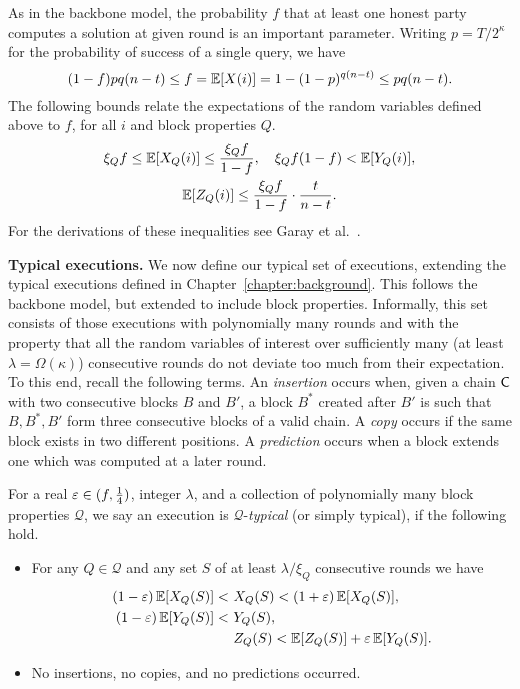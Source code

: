 As in the backbone model, the probability $f$ that at least one honest party
computes a solution at given round is an important parameter.
Writing $p=T/2^\kappa$ for the probability of success of a single query, we
have
\[
	(1-f){pq(n-t)}\leq f=\operatorname{\mathbb{E}}[X(i)]=1-(1-p)^{q(n-t)}\leq pq(n-t)
.\]
The following bounds relate the expectations of the random variables defined
above to $f$, for all $i$ and block properties $Q$.
\begin{gather*}
	\xi_Q f\leq\operatorname{\mathbb{E}}[X_Q(i)]\leq\frac{\xi_Q f}{1-f},\quad
		\xi_Q f(1-f)<\operatorname{\mathbb{E}}[Y_Q(i)],\\
	\operatorname{\mathbb{E}}[Z_Q(i)]\leq\frac{\xi_Q f}{1-f}\cdot\frac t{n-t}
.\end{gather*}
For the derivations of these inequalities see Garay et al.~\cite{backbone-new}.

\noindent
\textbf{Typical executions.}
We now define our typical set of executions, extending the typical executions
defined in Chapter~\ref{chapter:background}.
This follows the backbone model, but
extended to include block properties.
Informally, this set consists of
those executions with polynomially many rounds and with the property that all
the random variables of interest over sufficiently many (at least
$\lambda=\Omega(\kappa)$) consecutive rounds do not deviate too much from
their expectation.
To this end, recall the following terms. An
\emph{insertion} occurs when, given a chain $\mathsf{C}$ with two consecutive
blocks $B$ and $B'$, a block $B^*$ created after $B'$ is such that $B,B^*,B'$
form three consecutive blocks of a valid chain. A \emph{copy} occurs if the
same block exists in two different positions. A \emph{prediction} occurs when
a block extends one which was computed at a later round.

\begin{definition}\label{def:typical}
	For a real $\varepsilon\in(f,\frac14)$, integer $\lambda$, and
	a collection of polynomially many block properties $\mathcal{Q}$, we say an
	execution is $\mathcal{Q}$-\emph{typical} (or simply typical), if the following
	hold.
	\begin{itemize}
		\item
			For any $Q\in\mathcal{Q}$ and any set $S$ of at least $\lambda/\xi_Q$
			consecutive rounds we have
			\begin{align}
				(1-\varepsilon)\operatorname{\mathbb{E}}[X_Q(S)]<~&X_Q(S)<(1+\varepsilon)\operatorname{\mathbb{E}}[X_Q(S)],
				\\(1-\varepsilon)\operatorname{\mathbb{E}}[Y_Q(S)]<~&Y_Q(S),
				\\&Z_Q(S)<\operatorname{\mathbb{E}}[Z_Q(S)]+\varepsilon\operatorname{\mathbb{E}}[Y_Q(S)].
			\end{align}
		\item
			No insertions, no copies, and no predictions occurred.
	\end{itemize}
\end{definition}%

